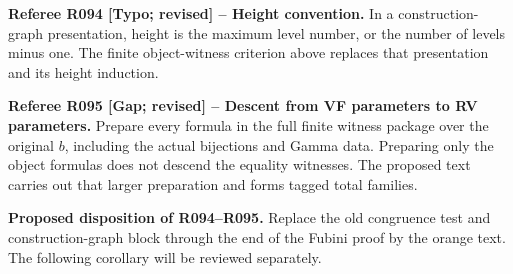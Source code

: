 \documentclass[12pt]{amsart}
\theoremstyle{remark}
\theoremstyle{definition}
\numberwithin{equation}{section}
\theoremstyle{plain}
\theoremstyle{plain}
\begin{document}
\medskip
{\normalfont\small\color{RefereePurple}
\noindent\textbf{Referee R094 [Typo; revised] --
Height convention.}
In a construction-graph presentation, height is the
maximum level number, or the number of levels minus one.
The finite object-witness criterion above replaces that
presentation and its height induction.\par
\medskip
\noindent\textbf{Referee R095 [Gap; revised] --
Descent from VF parameters to RV parameters.}
Prepare every formula in the full finite witness package
over the original $b$, including the actual bijections
and Gamma data. Preparing only the object formulas does
not descend the equality witnesses. The proposed text
carries out that larger preparation and forms tagged
total families.\par}
\medskip
{\normalfont\small\color{ProposalOrange}
\noindent\textbf{Proposed disposition of R094--R095.}
Replace the old congruence test and construction-graph
block through the end of the Fubini proof by the orange
text. The following corollary will be reviewed separately.}
\end{document}
